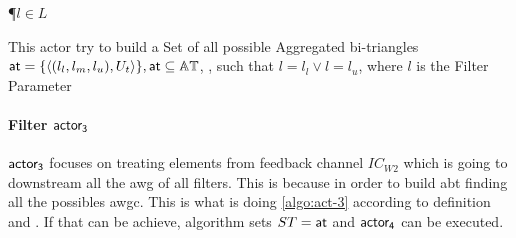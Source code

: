 \begin{algorithm}
\DontPrintSemicolon
{}
\P{$l \in L$}
\FS{$\dwi \subseteq \dw$}
\BlankLine
{}
\PC{$|\ati| \geq 1 \lor \fid$}
\caption{This actor try to build a Set of all possible Aggregated bi-triangles $\mathsf{at} = \{\left\langle (l_l, l_m, l_u), U_t \right\rangle\}, \mathsf{at} \subseteq \mathbb{AT}$, , such that $l = l_l \lor l = l_u$, where $l$ is the Filter Parameter}
\label{algo:act-3}
\end{algorithm}

\paragraph{Filter $\mathsf{actor_3}$} $\mathsf{actor_3}$ focuses on treating elements from feedback channel $IC_{W2}$ which is going to downstream all the \acrshort{awg} of all filters.
This is because in order to build \acrshort{abt} finding all the possibles \acrshort{awgc}. This is what is doing \autoref{algo:act-3} according to definition 
 and . If that can be achieve, algorithm sets $ST = \mathsf{at}$ and $\mathsf{actor_4}$ can be executed.

